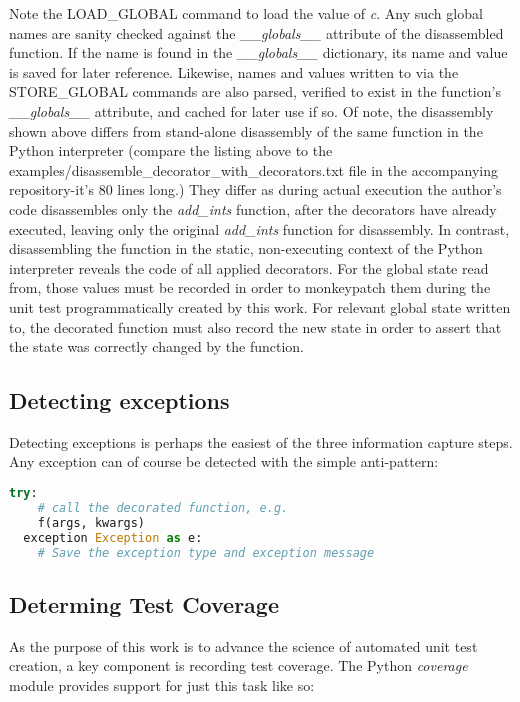 

Note the LOAD\_GLOBAL command to load the value of \textit{c}.  Any such global names 
are sanity checked against the \textit{\_\_globals\_\_} attribute of the 
disassembled function.
%
If the name is found in the \textit{\_\_globals\_\_} dictionary, its name and 
value is saved for later reference.  Likewise, names and values written to via 
the STORE\_GLOBAL commands are also parsed, verified to exist in the function's
 \textit{\_\_globals\_\_} attribute, and cached for later use if so.
%
Of note, the disassembly shown above differs from stand-alone disassembly of 
the same function in the Python interpreter (compare the listing above to the
 examples/disassemble\_decorator\_with\_decorators.txt file in the 
 accompanying repository-it's 80 lines long.)
They differ as during actual execution the author's code
 disassembles only the \textit{add\_ints} function, after the decorators
  have already executed, leaving only the original  \textit{add\_ints}
  function for disassembly.
In contrast, disassembling the function in the static, non-executing context of
the Python interpreter reveals the code of all applied decorators.  
%
For the global state read from, those values must be recorded 
in order to monkeypatch them during the unit test programmatically 
created by this work.
%
For relevant global state written to, the decorated function must also record
the new state in order to assert that the state was correctly changed by the function.

\subsection{Detecting exceptions}\label{sec:approach-internal-3}
Detecting exceptions is perhaps the easiest of the three information capture steps.
Any exception can of course be detected with the simple anti-pattern:

\begin{lstlisting}[language=Python, caption={Catching and recording exceptions}]
  try:
    # call the decorated function, e.g.
    f(args, kwargs)
  exception Exception as e:
    # Save the exception type and exception message
  \end{lstlisting}

\subsection{Determing Test Coverage}\label{sec:approach-internal-4}
As the purpose of this work is to advance the science of automated unit test 
creation, a key component is recording test coverage.  The Python \textit{coverage}
module provides support for just this task like so:

